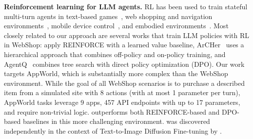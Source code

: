 \textbf{Reinforcement learning for LLM agents.}
RL has been used to train stateful multi-turn agents in text-based games~\cite{narasimhan2015language,yao2020keep,carta2023grounding}, web shopping and navigation  environments~\cite{yao2022webshop}, mobile device control~\cite{bai2024digirl}, and embodied environments~\cite{zhai2024fine}.
Most closely related to our approach are several works that train LLM policies with RL in WebShop:
\citet{yao2022webshop} apply REINFORCE with a learned value baseline,
ArCHer~\cite{zhou2024archer} uses a hierarchical approach that combines off-policy and on-policy training, and
AgentQ~\cite{putta2024agent} combines tree search with direct policy optimization (DPO).
Our work targets AppWorld, which is substantially more complex than the WebShop environment.
While the goal of all WebShop scenarios is to purchase a described item from a simulated site with 8 actions (with at most 1 parameter per turn), AppWorld tasks leverage 9 apps, 457 API endpoints with up to 17 parameters, and require non-trivial logic.
\ours outperforms both REINFORCE-based and DPO-based baselines in this more challenging environment.
\ours was discovered independently in the context of Text-to-Image Diffusion Fine-tuning by \citet{gupta2025simple}.
%
%
%


%
%
%
%
%
%

%
%


%

%
%
%
%
%
%
%
%

%

%
%

%
%
%
%
%
%

%

%
%
%
%
%
%
%
%
%

%
%

%
%
%
%
%
%
%
%
%

%
%
%
%

%
%
%
%
%

%
%


%
%
%
%

%


%
%
%
%
%

%
%
%
%
%
%

%

%
%
%
%
%
%
%
%
%

%
%
%
%
%
%
%
%
%

%
%
%
%
%
%
%

%

%
%
%

%
%
%

%
%

%
%

%



%
%

%
%

%
%
%
%
%

%
%

%
%

%

%
%

%
%
%
%
%
%